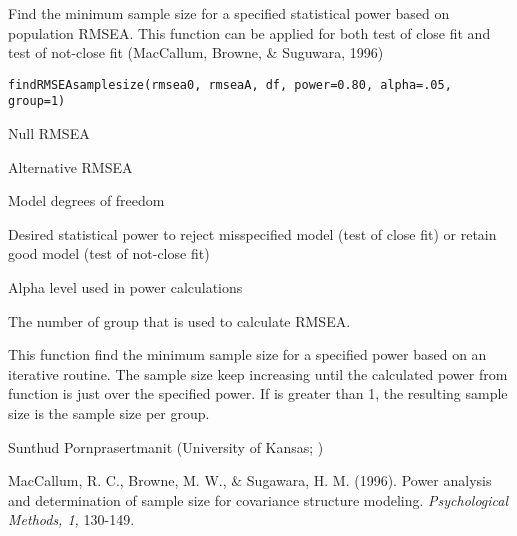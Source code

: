 \documentclass[a4paper]{book}
\begin{document}
%
\begin{Description}\relax
Find the minimum sample size for a specified statistical power based on population RMSEA. This function can be applied for both test of close fit and test of not-close fit (MacCallum, Browne, \& Suguwara, 1996)
\end{Description}
%
\begin{Usage}
\begin{verbatim}
findRMSEAsamplesize(rmsea0, rmseaA, df, power=0.80, alpha=.05, group=1)
\end{verbatim}
\end{Usage}
%
\begin{Arguments}
\begin{ldescription}
\item[\code{rmsea0}] Null RMSEA
\item[\code{rmseaA}] Alternative RMSEA
\item[\code{df}] Model degrees of freedom
\item[\code{power}] Desired statistical power to reject misspecified model (test of close fit) or retain good model (test of not-close fit)
\item[\code{alpha}] Alpha level used in power calculations
\item[\code{group}] The number of group that is used to calculate RMSEA.

\end{ldescription}
\end{Arguments}
%
\begin{Details}\relax
This function find the minimum sample size for a specified power based on an iterative routine. The sample size keep increasing until the calculated power from  function is just over the specified power. If  is greater than 1, the resulting sample size is the sample size per group.
\end{Details}
%
\begin{Author}\relax
Sunthud Pornprasertmanit (University of Kansas; )
\end{Author}
%
\begin{References}\relax
MacCallum, R. C., Browne, M. W., \& Sugawara, H. M. (1996). Power analysis and determination of sample size for covariance structure modeling. \emph{Psychological Methods, 1,} 130-149.
\end{References}
\end{document}
